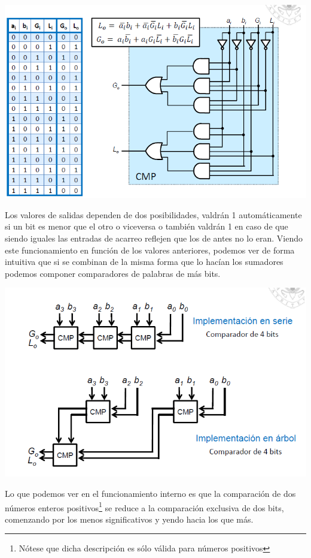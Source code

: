 \documentclass[a4paper,10pt]{book}
\begin{document}
\begin{center}
\includegraphics[scale=0.69]{comparador1}
\end{center}

Los valores de salidas dependen de dos posibilidades, valdrán 1 automáticamente si un bit es menor que el otro o viceversa o también valdrán 1 en caso de que siendo iguales las entradas de acarreo reflejen que los de antes no lo eran. Viendo este funcionamiento en función de los valores anteriores, podemos ver de forma intuitiva que si se combinan de la misma forma que lo hacían los sumadores podemos componer comparadores de palabras de más bits.
\begin{center}
\includegraphics[scale=0.64]{comparador2}
\end{center}

Lo que podemos ver en el funcionamiento interno es que la comparación de dos números enteros positivos\footnote{Nótese que dicha descripción es sólo válida para números positivos} se reduce a la comparación exclusiva de dos bits, comenzando por los menos significativos y yendo hacia los que más.
\end{document}
